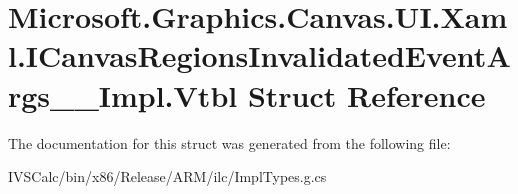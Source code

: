 \hypertarget{struct_microsoft_1_1_graphics_1_1_canvas_1_1_u_i_1_1_xaml_1_1_i_canvas_regions_invalidated_event_args_____impl_1_1_vtbl}{}\section{Microsoft.\+Graphics.\+Canvas.\+U\+I.\+Xaml.\+I\+Canvas\+Regions\+Invalidated\+Event\+Args\+\_\+\+\_\+\+Impl.\+Vtbl Struct Reference}
\label{struct_microsoft_1_1_graphics_1_1_canvas_1_1_u_i_1_1_xaml_1_1_i_canvas_regions_invalidated_event_args_____impl_1_1_vtbl}


The documentation for this struct was generated from the following file\+:\begin{DoxyCompactItemize}
\item 
I\+V\+S\+Calc/bin/x86/\+Release/\+A\+R\+M/ilc/Impl\+Types.\+g.\+cs\end{DoxyCompactItemize}

